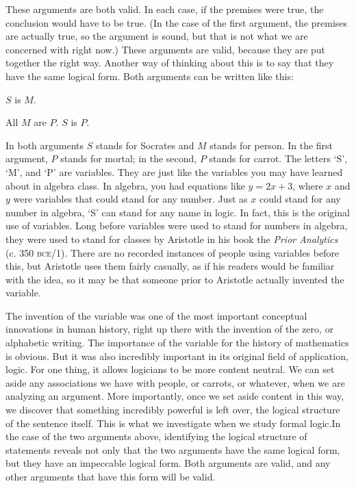 These arguments are both valid. In each case, if the premises were true, the conclusion would have to be true. (In the case of the first argument, the premises are actually true, so the argument is sound, but that is not what we are concerned with right now.) These arguments are valid, because they are put together the right way. Another way of thinking about this is to say that they have the same logical form. Both arguments can be written like this:

\begin{earg*}
\item $S$ is $M$.
\item All $M$ are $P$.
\itemc[.2] $S$ is $P$.
\end{earg*}

In both arguments $S$ stands for Socrates and $M$ stands for person. In the first argument, $P$ stands for mortal; in the second, $P$ stands for carrot.  The letters `S', `M', and `P' are variables. They are just like the variables you may have learned about in algebra class. In algebra, you had equations like $y = 2x + 3$, where $x$ and $y$ were variables that could stand for any number. Just as $x$ could stand for any number in algebra, `S' can stand for any name in logic. In fact, this is the original use of variables. Long before variables were used to stand for numbers in algebra, they were used to stand for classes by Aristotle in his book the \textit{Prior Analytics} (c. 350 \textsc{bce}/1\citeyear{Aristotle1984b}). There are no recorded instances of people using variables before this, but Aristotle uses them fairly casually, as if his readers would be familiar with the idea, so it may be that someone prior to Aristotle actually invented the variable.

The invention of the variable was one of the most important conceptual innovations in human history, right up there with the invention of the zero, or alphabetic writing. The importance of the variable for the history of mathematics is obvious. But it was also incredibly important in its original field of application, logic. For one thing, it allows logicians to be more content neutral. We can set aside any associations we have with people, or carrots, or whatever, when we are analyzing an argument. More importantly, once we set aside content in this way, we discover that something incredibly powerful is left over, the logical structure of the sentence itself. This is what we investigate when we study formal logic.In the case of the two arguments above, identifying the logical structure of statements reveals not only that the two arguments have the same logical form, but they have an impeccable logical form. Both arguments are valid, and any other arguments that have this form will be valid. 


